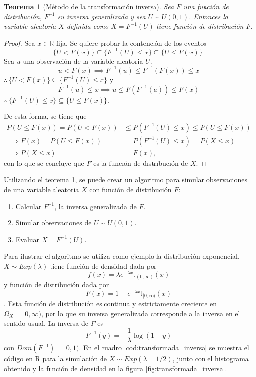 \documentclass[11pt,a4paper]{article}
\newtheorem{theorem}{Teorema}[section]
\begin{document}
\begin{theorem}[Método de la transformación inversa] \label{teo:trans}
Sea $F$ una función de distribución, $F^{-1}$ su inversa generalizada y sea $U\sim U(0,1)$. Entonces la variable aleatoria $X$ definida como $X = F^{-1}(U)$ tiene función de distribución $F$.
\end{theorem}
\begin{proof}
Sea $x\in \mathbb{R}$ fija. Se quiere probar la contención de los eventos $$\{U<F(x)\}\subseteq\{F^{-1}(U)\leq x\}\subseteq\{U\leq F(x)\}.$$ Sea $u$ una observación de la variable aleatoria $U$.
$$u<F(x) \implies F^{-1}(u) \leq F^{-1}(F(x)) \leq x$$
$\therefore \hspace{2pt} \{U<F(x)\} \subseteq\{F^{-1}(U)\leq x\}$ y
$$F^{-1}(u)\leq x \implies u\leq F(F^{-1}(u))\leq F(x)$$
$\therefore \hspace{2pt} \{F^{-1}(U)\leq x\}\subseteq \{U \leq F(x)\}$.

De esta forma, se tiene que 
\begin{align*}
P\left(U\leq F(x)\right) = P\left(U<F(x)\right) &\leq P\left(F^{-1}(U)\leq x\right) \leq P\left(U \leq F(x)\right)\\
\implies F(x) = P\left(U \leq F(x)\right) &= P\left(F^{-1}(U)\leq x\right) = P\left(X\leq x\right)\\
\implies P\left(X \leq x\right) &= F(x),
\end{align*}
con lo que se concluye que $F$ es la función de distribución de $X$.
\end{proof}

Utilizando el teorema \ref{teo:trans}, se puede crear un algoritmo para simular observaciones de una variable aleatoria $X$ con función de distribución $F$:
\begin{enumerate}
\item Calcular $F^{-1}$, la inversa generalizada de $F$.
\item Simular observaciones de $U\sim U(0,1)$.
\item Evaluar $X=F^{-1}(U)$.
\end{enumerate}

Para ilustrar el algoritmo se utiliza como ejemplo la distribución exponencial. $X\sim Exp(\lambda)$ tiene función de densidad dada por $$f(x) = \lambda e^{-\lambda x} \mathbb{I}_{(0,\infty)}(x)$$ y función de distribución dada por $$F(x) = 1-e^{-\lambda x}\mathbb{I}_{[0,\infty)}(x)$$. Esta función de distribución es continua y estrictamente creciente en $\Omega_X=[0, \infty)$, por lo que su inversa generalizada corresponde a la inversa en el sentido usual. La inversa de $F$ es $$F^{-1}(y) = -\frac{1}{\lambda}\log (1-y)$$ con $Dom(F^{-1}) = [0, 1)$. En el cuadro \ref{cod:transformada_inversa} se muestra el código en R para la simulación de $X \sim Exp(\lambda = 1/2)$, junto con el histograma obtenido y la función de densidad en la figura \ref{fig:transformada_inversa}.
\end{document}
